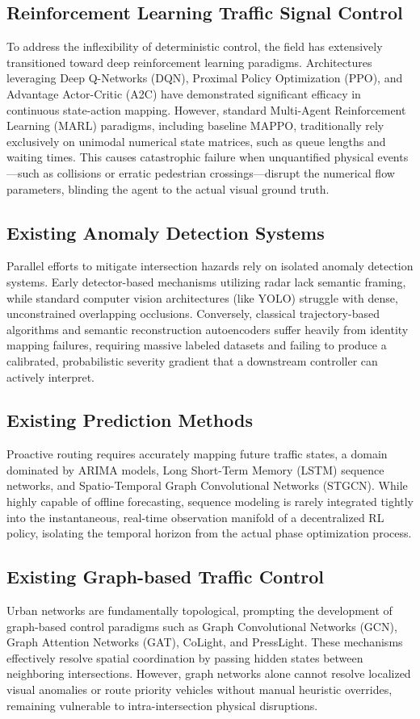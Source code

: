 \documentclass[journal]{IEEEtran}
\begin{document}
\subsection{Reinforcement Learning Traffic Signal Control}
To address the inflexibility of deterministic control, the field has extensively transitioned toward deep reinforcement learning paradigms. Architectures leveraging Deep Q-Networks (DQN), Proximal Policy Optimization (PPO), and Advantage Actor-Critic (A2C) have demonstrated significant efficacy in continuous state-action mapping. However, standard Multi-Agent Reinforcement Learning (MARL) paradigms, including baseline MAPPO, traditionally rely exclusively on unimodal numerical state matrices, such as queue lengths and waiting times. This causes catastrophic failure when unquantified physical events—such as collisions or erratic pedestrian crossings—disrupt the numerical flow parameters, blinding the agent to the actual visual ground truth.

\subsection{Existing Anomaly Detection Systems}
Parallel efforts to mitigate intersection hazards rely on isolated anomaly detection systems. Early detector-based mechanisms utilizing radar lack semantic framing, while standard computer vision architectures (like YOLO) struggle with dense, unconstrained overlapping occlusions. Conversely, classical trajectory-based algorithms and semantic reconstruction autoencoders suffer heavily from identity mapping failures, requiring massive labeled datasets and failing to produce a calibrated, probabilistic severity gradient that a downstream controller can actively interpret.

\subsection{Existing Prediction Methods}
Proactive routing requires accurately mapping future traffic states, a domain dominated by ARIMA models, Long Short-Term Memory (LSTM) sequence networks, and Spatio-Temporal Graph Convolutional Networks (STGCN). While highly capable of offline forecasting, sequence modeling is rarely integrated tightly into the instantaneous, real-time observation manifold of a decentralized RL policy, isolating the temporal horizon from the actual phase optimization process.

\subsection{Existing Graph-based Traffic Control}
Urban networks are fundamentally topological, prompting the development of graph-based control paradigms such as Graph Convolutional Networks (GCN), Graph Attention Networks (GAT), CoLight, and PressLight. These mechanisms effectively resolve spatial coordination by passing hidden states between neighboring intersections. However, graph networks alone cannot resolve localized visual anomalies or route priority vehicles without manual heuristic overrides, remaining vulnerable to intra-intersection physical disruptions.
\end{document}
